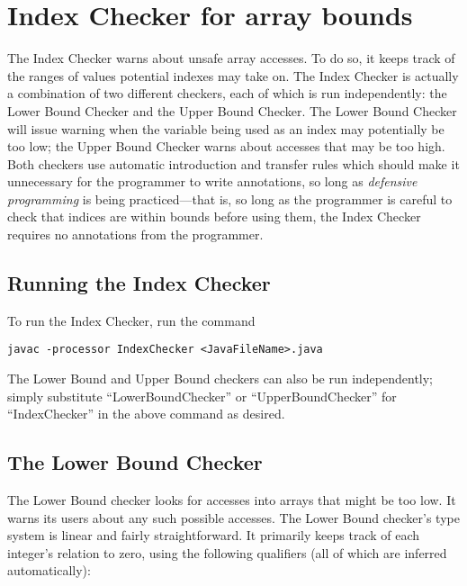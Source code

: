 \chapter{Index Checker for array bounds\label{index-checker}}

The Index Checker warns about unsafe array
accesses.  To do so, it keeps track of the ranges of values potential
indexes may take on.  The Index Checker is actually a combination of
two different checkers, each of which is run independently: the Lower
Bound Checker and the Upper Bound Checker.  The Lower Bound Checker
will issue warning when the variable being used as an index may
potentially be too low; the Upper Bound Checker warns about accesses
that may be too high. Both checkers use automatic introduction and
transfer rules which should make it unnecessary for the programmer to
write annotations, so long as \textit{defensive programming} is being
practiced---that is, so long as the programmer is careful to check
that indices are within bounds before using them, the Index Checker
requires no annotations from the programmer.

\section{Running the Index Checker\label{index-running}}

To run the Index Checker, run the command

\begin{Verbatim}
javac -processor IndexChecker <JavaFileName>.java
\end{Verbatim}

The Lower Bound and Upper Bound checkers can also be run
independently; simply substitute ``LowerBoundChecker'' or
``UpperBoundChecker'' for ``IndexChecker'' in the above command as
desired.

\section{The Lower Bound Checker\label{index-lowerbound}}

The Lower Bound checker looks for accesses into arrays that might be
too low.  It warns its users about any such possible accesses. The
Lower Bound checker's type system is linear and fairly
straightforward. It primarily keeps track of each integer's relation
to zero, using the following qualifiers (all of which are inferred
automatically):

